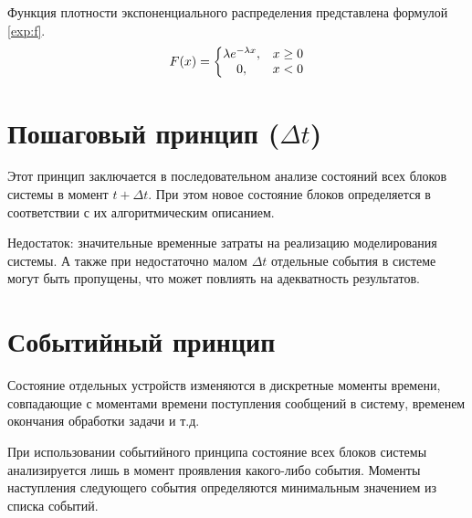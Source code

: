 Функция плотности экспоненциального распределения представлена формулой \ref{exp:f}.
\begin{equation}\label{exp:f}
F(x) = \left\{\begin{matrix}
$$
\lambda e^{-\lambda x}, & x \geq 0 \\
0, & x < 0
$$
\end{matrix}\right.
\end{equation}

\section{Пошаговый принцип ($\Delta t$)}
Этот принцип заключается в последовательном анализе состояний всех блоков системы в момент $t + \Delta t$. При этом новое состояние блоков определяется в соответствии с их алгоритмическим описанием. 

Недостаток: значительные временные затраты на реализацию моделирования системы. А также при недостаточно малом $\Delta t$ отдельные события в системе могут быть пропущены, что может повлиять на адекватность результатов.

\section{Событийный принцип}
Состояние отдельных устройств изменяются в дискретные моменты времени, совпадающие с моментами времени поступления сообщений в систему, временем окончания обработки задачи и т.д.

При использовании событийного принципа состояние всех блоков системы анализируется лишь в момент проявления какого-либо события. Моменты наступления следующего события определяются минимальным значением из списка событий.
